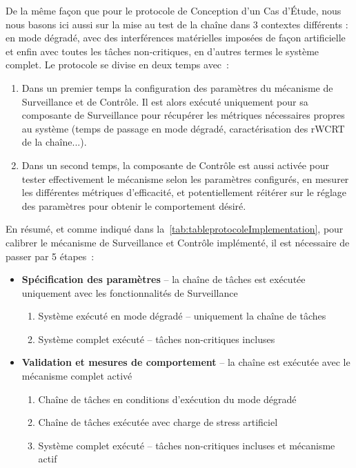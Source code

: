 \documentclass[french, a4paper, 11pt, twoside, pdftex]{StyleThese}
\begin{document}
		De la même façon que pour le protocole de Conception d'un Cas d'Étude, nous nous basons ici aussi sur la mise au test de la chaîne  dans 3 contextes différents : en mode dégradé, avec des interférences matérielles imposées de façon artificielle et enfin avec toutes les tâches non-critiques, en d'autres termes le système complet. Le protocole se divise en deux temps avec~: 
		\begin{enumerate}
			\item Dans un premier temps la configuration des paramètres du mécanisme de Surveillance et de Contrôle. Il est alors exécuté uniquement pour sa composante de Surveillance pour récupérer les métriques nécessaires propres au système (temps de passage en mode dégradé, caractérisation des rWCRT de la chaîne...). 
			\item 		Dans un second temps, la composante de Contrôle est aussi activée pour tester effectivement le mécanisme selon les paramètres configurés, en mesurer les différentes métriques d'efficacité, et potentiellement réitérer sur le réglage des paramètres pour obtenir le comportement désiré.
		\end{enumerate}
		En résumé, et comme indiqué dans la~\autoref{tab:tableprotocoleImplementation}, pour calibrer le mécanisme de Surveillance et Contrôle implémenté, il est nécessaire de passer par 5 étapes~:
		\begin{itemize}
			\item \textbf{Spécification des paramètres} -- la chaîne de tâches est exécutée uniquement avec les fonctionnalités de Surveillance
			\begin{enumerate}[label=\large\ctxt{\arabic*}]
				\item Système exécuté en mode dégradé -- uniquement la chaîne de tâches
				\item Système complet exécuté -- tâches non-critiques incluses
			\end{enumerate}
			\item \textbf{Validation et mesures de comportement} -- la chaîne est exécutée avec le mécanisme complet activé
			\begin{enumerate}[resume*]
				\item Chaîne de tâches en conditions d'exécution du mode dégradé
				\item Chaîne de tâches exécutée avec charge de stress artificiel			
				\item Système complet exécuté -- tâches non-critiques incluses et mécanisme actif
			\end{enumerate}
		\end{itemize}
		
\end{document}
